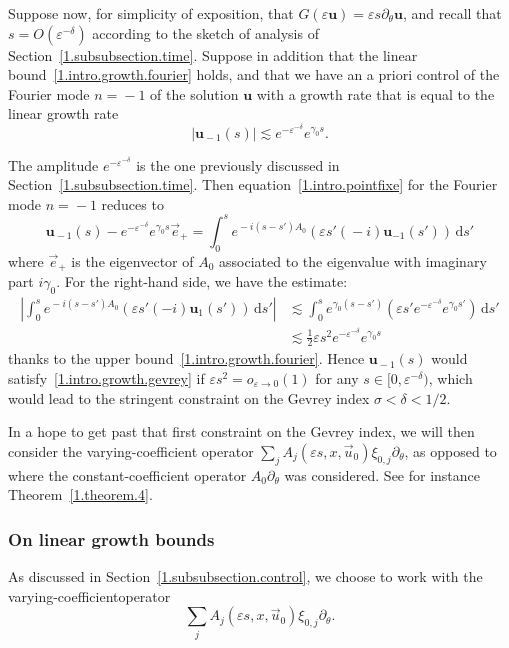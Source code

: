 \documentclass[10pt]{amsart}
\theoremstyle{definition}
\theoremstyle{plain}
\newcommand*\e{\varepsilon}
\newcommand{\dptl}{\partial}%
\newcommand*\g{\gamma}
\newcommand{\ubf}{{\mathbf u}}
\newcommand{\rmd}{\mathrm{d}}
\begin{document}
Suppose now, for simplicity of exposition, that $G(\e \ubf) = \e s \dptl_{\theta} \ubf$, and recall that $s = O(\e^{-\delta})$ according to the sketch of analysis of Section~\ref{1.subsubsection.time}. Suppose in addition that the linear bound~\eqref{1.intro.growth.fourier} holds, and that we have an a priori control of the Fourier mode $n={}-1$ of the solution $\ubf$ with a growth rate that is equal to the linear growth rate
\[
|\ubf_{{}-1}(s)| \lesssim e^{-\e^{-\delta}} e^{\g_0 s}.
\]


The amplitude $e^{-\e^{-\delta}}$ is the one previously discussed in Section~\ref{1.subsubsection.time}. Then equation~\eqref{1.intro.pointfixe} for the Fourier mode $n={}-1$ reduces to
\[
\ubf_{{}-1}(s) - e^{-\e^{-\delta}}e^{\g_0 s}\vec{e}_{+} = \int_{0}^{s} e^{{}-i(s-s')A_0} \left(\e s' ({}-i) \ubf_{-1}(s')\right) \,{\rmd}s'
\]
where $\vec{e}_{+}$ is the eigenvector of $A_0$ associated to the eigenvalue with imaginary part $i\g_0$. For the right-hand side, we have the estimate:
\begin{align}
\left| \int_{0}^{s} e^{{}-i(s-s')A_0} \left(\e s' (-i) \ubf_1(s')\right) \,{\rmd}s' \right| & \lesssim \int_{0}^{s} e^{\g_0(s-s')} \left(\e s' e^{-\e^{-\delta}} e^{\g_0 s'}\right) \,{\rmd}s' \nonumber \\
& \lesssim \frac{1}{2} \e s^2 e^{-\e^{-\delta}}e^{\g_0 s} \label{1.intro.computation}
\end{align}
thanks to the upper bound~\eqref{1.intro.growth.fourier}. Hence $\ubf_{{}-1}(s)$ would satisfy~\eqref{1.intro.growth.gevrey} if $ \e s^2 = o_{\e\to0}(1) $ for any $s\in[0,\e^{-\delta})$, which would lead to the stringent constraint on the Gevrey index $ \sigma < \delta < 1/2 $.

In a hope to get past that first constraint on the Gevrey index, we will then consider the varying-coefficient operator $\sum_j A_j(\e s, x,
\vec{u}_0)\xi_{0,j} \dptl_{\theta}$, as opposed to~\cite{metivier2005remarks} where the constant-coefficient operator $A_0 \dptl_{\theta}$ was considered. See for instance Theorem~\ref{1.theorem.4}.


\subsubsection{On linear growth bounds}\label{1.intro.section.bounds}

As discussed in Section~\ref{1.subsubsection.control}, we choose to work with the varying-coefficient\linebreak operator
\[
\sum_j A_j(\e s, x, \vec{u}_0)\xi_{0,j} \dptl_{\theta}.
\]
\end{document}
